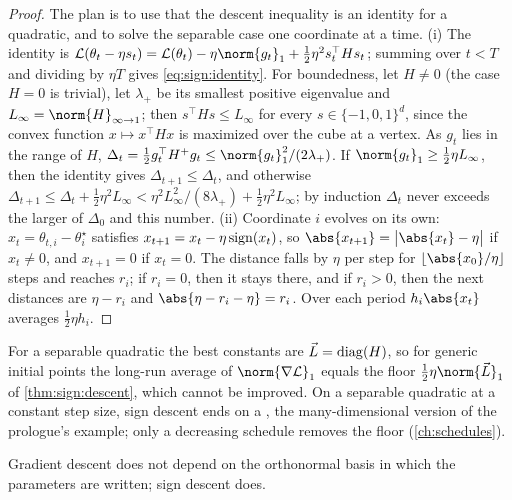 \begin{refsection}
\begin{proof}
The plan is to use that the descent inequality is an identity for a quadratic, and to solve the separable case one coordinate at a time. (i) The identity is $\Loss(\theta_t-\eta s_t)=\Loss(\theta_t)-\eta\norm{g_t}_1+\frac12\eta^2s_t^\top Hs_t$; summing over $t<T$ and dividing by $\eta T$ gives \eqref{eq:sign:identity}. For boundedness, let $H\ne0$ (the case $H=0$ is trivial), let $\lambda_+$ be its smallest positive eigenvalue and $L_\infty=\norm{H}_{\infty\to1}$; then $s^\top Hs\le L_\infty$ for every $s\in\{-1,0,1\}^d$, since the convex function $x\mapsto x^\top Hx$ is maximized over the cube at a vertex. As $g_t$ lies in the range of $H$, $\Delta_t=\frac12g_t^\top H^+g_t\le\norm{g_t}_1^2/(2\lambda_+)$. If $\norm{g_t}_1\ge\frac12\eta L_\infty$, then the identity gives $\Delta_{t+1}\le\Delta_t$, and otherwise $\Delta_{t+1}\le\Delta_t+\frac12\eta^2L_\infty<\eta^2L_\infty^2/(8\lambda_+)+\frac12\eta^2L_\infty$; by induction $\Delta_t$ never exceeds the larger of $\Delta_0$ and this number.
(ii) Coordinate $i$ evolves on its own: $x_t=\theta_{t,i}-\theta^\star_i$ satisfies $x_{t+1}=x_t-\eta\operatorname{sign}(x_t)$, so $\abs{x_{t+1}}=\bigl\lvert\abs{x_t}-\eta\bigr\rvert$ if $x_t\ne0$, and $x_{t+1}=0$ if $x_t=0$. The distance falls by $\eta$ per step for $\lfloor\abs{x_0}/\eta\rfloor$ steps and reaches $r_i$; if $r_i=0$, then it stays there, and if $r_i>0$, then the next distances are $\eta-r_i$ and $\abs{\eta-r_i-\eta}=r_i$. Over each period $h_i\abs{x_t}$ averages $\frac12\eta h_i$.
\end{proof}

For a separable quadratic the best constants are $\vec L=\operatorname{diag}(H)$, so for generic initial points the long-run average of $\norm{\nabla\Loss}_1$ equals the floor $\frac12\eta\norm{\vec L}_1$ of \cref{thm:sign:descent}, which cannot be improved. On a separable quadratic at a constant step size, sign descent ends on a , the many-dimensional version of the prologue's example; only a decreasing schedule removes the floor (\cref{ch:schedules}).

Gradient descent does not depend on the orthonormal basis in which the parameters are written; sign descent does.


\end{refsection}
